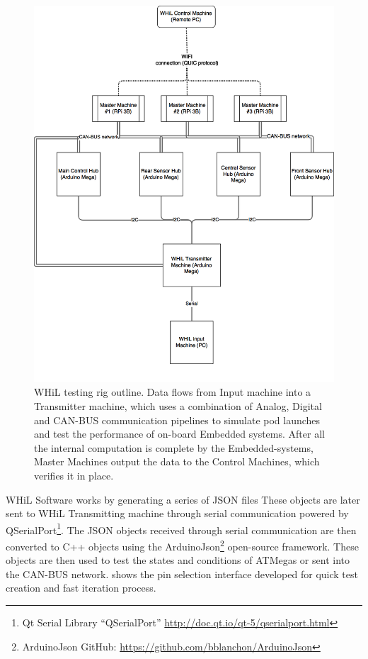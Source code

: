 \documentclass[main.tex]{subfiles}
\begin{document}
      \begin{figure}
        \centering
 		\includegraphics[width=\textwidth]{images/hil_testing_rig.png}
		\caption{WHiL testing rig outline. Data flows from Input machine into a Transmitter machine, which uses a combination of Analog, Digital and CAN-BUS communication pipelines to simulate pod launches and test the performance of on-board Embedded systems. After all the internal computation is complete by the Embedded-systems, Master Machines output the data to the Control Machines, which verifies it in place.}
        \label{fig:hil-testing-rig}
   \end{figure}
   
   WHiL Software works by generating a series of JSON files These objects are later sent to WHiL Transmitting machine through serial communication powered by QSerialPort\footnote{Qt Serial Library ``QSerialPort'' \url{http://doc.qt.io/qt-5/qserialport.html}}. The JSON objects received through serial communication are then converted to C++ objects using the ArduinoJson\footnote{ArduinoJson GitHub: \url{https://github.com/bblanchon/ArduinoJson}} open-source framework. These objects are then used to test the states and conditions of ATMegas or sent into the CAN-BUS network.  shows the pin selection interface developed for quick test creation and fast iteration process.
   
\end{document}
